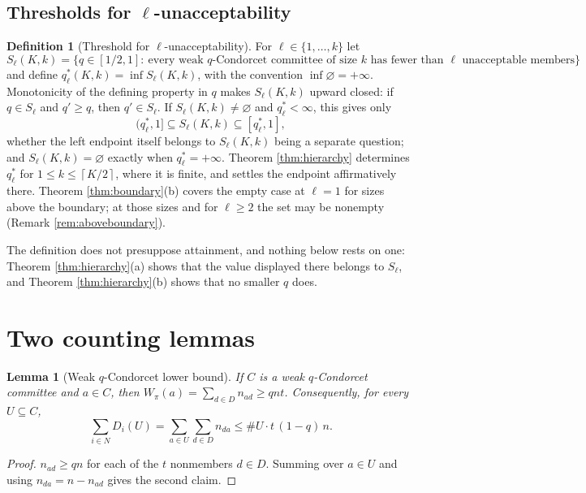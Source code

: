 \documentclass[11pt]{article}
\theoremstyle{plain}
\newtheorem{lemma}{Lemma}
\theoremstyle{definition}
\newtheorem{definition}{Definition}
\newcommand{\cl}[1]{\left\lceil #1\right\rceil}
\begin{document}
\subsection{Thresholds for $\ell$-unacceptability}

\begin{definition}[Threshold for $\ell$-unacceptability]
\label{def:threshold}
For $\ell\in\{1,\dots,k\}$ let
\[
S_\ell(K,k)=\bigl\{q\in[1/2,1]:\ \text{every weak }q\text{-Condorcet committee of size }k\text{ has fewer than }\ell\text{ unacceptable members}\bigr\}
\]
and define $q_\ell^*(K,k)=\inf S_\ell(K,k)$, with the convention $\inf\varnothing=+\infty$. Monotonicity of the defining property in $q$ makes $S_\ell(K,k)$ upward closed: if $q\in S_\ell$ and $q'\ge q$, then $q'\in S_\ell$. If $S_\ell(K,k)\ne\varnothing$ and $q_\ell^*<\infty$, this gives only
\[
(q_\ell^*,1]\subseteq S_\ell(K,k)\subseteq[q_\ell^*,1],
\]
whether the left endpoint itself belongs to $S_\ell(K,k)$ being a separate question; and $S_\ell(K,k)=\varnothing$ exactly when $q_\ell^*=+\infty$. Theorem \ref{thm:hierarchy} determines $q_\ell^*$ for $1\le k\le\cl{K/2}$, where it is finite, and settles the endpoint affirmatively there. Theorem \ref{thm:boundary}(b) covers the empty case at $\ell=1$ for sizes above the boundary; at those sizes and for $\ell\ge2$ the set may be nonempty (Remark \ref{rem:aboveboundary}).
\end{definition}

The definition does not presuppose attainment, and nothing below rests on one: Theorem \ref{thm:hierarchy}(a) shows that the value displayed there belongs to $S_\ell$, and Theorem \ref{thm:hierarchy}(b) shows that no smaller $q$ does.

\section{Two counting lemmas}
\label{sec:lemmas}

\begin{lemma}[Weak $q$-Condorcet lower bound]
\label{lem:qlower}
If $C$ is a weak $q$-Condorcet committee and $a\in C$, then $W_\pi(a)=\sum_{d\in D}n_{ad}\ge qnt$. Consequently, for every $U\subseteq C$,
\[
\sum_{i\in N}D_i(U)=\sum_{a\in U}\sum_{d\in D}n_{da}\le \#U\cdot t\,(1-q)\,n .
\]
\end{lemma}

\begin{proof}
$n_{ad}\ge qn$ for each of the $t$ nonmembers $d\in D$. Summing over $a\in U$ and using $n_{da}=n-n_{ad}$ gives the second claim.
\end{proof}
\end{document}
